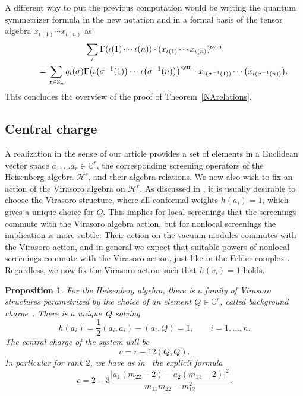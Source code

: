 \documentclass[10pt,a4paper]{amsart}
\numberwithin{equation}{section}
\newtheorem{prop}[teo]{Proposition}
\newcommand{\C}{\mathbb{C}}
\renewcommand{\S}{\mathbb{S}}
\newcommand{\Fp}{\mathrm{F}}
\begin{document}
A different way to put the previous computation would be writing the quantum symmetrizer formula in the new notation and in a formal basis of the tensor algebra $x_{\iota(1)}\cdots x_{\iota(n)}$ as
\begin{gather*}
\sum_\iota  \Fp(\iota(1)\cdots\iota(n))\cdot (x_{\iota(1)} \cdots x_{\iota(n)})^{{\rm sym}}\\
\qquad {} = \sum_{\sigma\in\S_n} q_\iota(\sigma)
\Fp\big(\iota\big(\sigma^{-1}(1)\big)\cdots\iota\big(\sigma^{-1}(n)\big)\big)^{{\rm sym}}
\cdot x_{\iota(\sigma^{-1}(1))} \cdots \big(x_{\iota(\sigma^{-1}(n))}\big).
\end{gather*}
This concludes the overview of the proof of Theorem~\ref{NArelations}.

\subsection{Central charge}
A realization in the sense of our article provides a set of elements in a Euclidean vector space $a_1,\dots a_r\in \C^r$, the corresponding screening operators of the Heisenberg algebra $\mathcal{H}^r$, and their algebra relations. We now also wish to fix an action of the Virasoro algebra on $\mathcal{H}^r$. As discussed in \cite{FL17}, it is usually desirable to choose the Virasoro structure, where all conformal weights $h(a_i)=1$, which gives a unique choice for $Q$. This implies for local screenings that the screenings commute with the Virasoro algebra action, but for nonlocal screenings the implication is more subtle: Their action on the vacuum modules commutes with the Virasoro action, and in general we expect that suitable powers of nonlocal screenings commute with the Virasoro action, just like in the Felder complex \cite{Fel89}. Regardless, we now fix the Virasoro action such that $h(v_i)=1$ holds.

\begin{prop}\label{central_charge} For the Heisenberg algebra, there is a family of Virasoro structures pa\-ra\-met\-ri\-zed by the choice of an element $Q\in \C^r$, called background charge~{\rm \cite{FF84}}. There is a uni\-que~$Q$ solving
	\begin{equation*}%
	h(a_i)=\frac{1}{2}(a_i,a_i) -(a_i,Q)=1, \qquad i=1, \dots, n.
	\end{equation*}
	The central charge of the system will be \[c = r - 12(Q, Q).\]
	In particular for rank $2$, we have as in~{\rm \cite{Sem14}} the explicit formula
	\begin{equation}\label{centralcharge}
	c = 2-3\frac{|a_1(m_{22}-2)-a_2(m_{11}-2)|^2}{m_{11}m_{22}-m_{12}^2}.
	\end{equation}
\end{prop}
\end{document}
